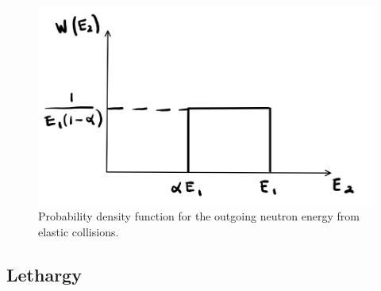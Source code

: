 \begin{figure}[h]
  \centering
  \includegraphics[scale=0.50]{./Figures/P1/probOut.png} 
  \caption{Probability density function for the outgoing neutron energy from elastic collisions.} 
  \label{fig:pdf}
\end{figure}

\subsection{Lethargy}

